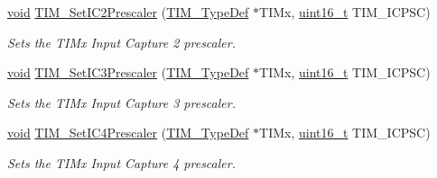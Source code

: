 \begin{DoxyCompactItemize}
\hyperlink{group___n_a_m_e_ga18028b8badbf1ea7e704ccac3c488e82}{void} \hyperlink{group___t_i_m___group3_ga3cc4869b5fe73271808512c89322a325}{T\-I\-M\-\_\-\-Set\-I\-C2\-Prescaler} (\hyperlink{struct_t_i_m___type_def}{T\-I\-M\-\_\-\-Type\-Def} $\ast$T\-I\-Mx, \hyperlink{stdint_8h_a273cf69d639a59973b6019625df33e30}{uint16\-\_\-t} T\-I\-M\-\_\-\-I\-C\-P\-S\-C)
\begin{DoxyCompactList}\small\item\em Sets the T\-I\-Mx Input Capture 2 prescaler. \end{DoxyCompactList}\item 
\hyperlink{group___n_a_m_e_ga18028b8badbf1ea7e704ccac3c488e82}{void} \hyperlink{group___t_i_m___group3_ga76f906383b8132ebe00dffadb70cf7f9}{T\-I\-M\-\_\-\-Set\-I\-C3\-Prescaler} (\hyperlink{struct_t_i_m___type_def}{T\-I\-M\-\_\-\-Type\-Def} $\ast$T\-I\-Mx, \hyperlink{stdint_8h_a273cf69d639a59973b6019625df33e30}{uint16\-\_\-t} T\-I\-M\-\_\-\-I\-C\-P\-S\-C)
\begin{DoxyCompactList}\small\item\em Sets the T\-I\-Mx Input Capture 3 prescaler. \end{DoxyCompactList}\item 
\hyperlink{group___n_a_m_e_ga18028b8badbf1ea7e704ccac3c488e82}{void} \hyperlink{group___t_i_m___group3_ga0f2c784271356d6b64b8c0da64dbdbc2}{T\-I\-M\-\_\-\-Set\-I\-C4\-Prescaler} (\hyperlink{struct_t_i_m___type_def}{T\-I\-M\-\_\-\-Type\-Def} $\ast$T\-I\-Mx, \hyperlink{stdint_8h_a273cf69d639a59973b6019625df33e30}{uint16\-\_\-t} T\-I\-M\-\_\-\-I\-C\-P\-S\-C)
\begin{DoxyCompactList}\small\item\em Sets the T\-I\-Mx Input Capture 4 prescaler. \end{DoxyCompactList}\end{DoxyCompactItemize}


